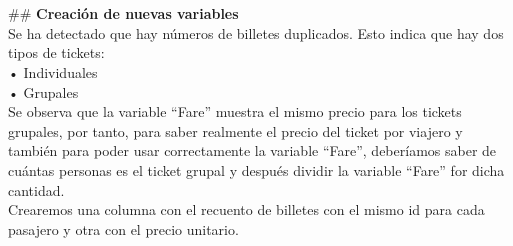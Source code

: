 \documentclass[
]{article}
\newenvironment{Shaded}{\begin{snugshade}}{\end{snugshade}}
\newcommand{\CommentTok}[1]{\textcolor[rgb]{0.56,0.35,0.01}{\textit{#1}}}
\newcommand{\DataTypeTok}[1]{\textcolor[rgb]{0.13,0.29,0.53}{#1}}
\newcommand{\KeywordTok}[1]{\textcolor[rgb]{0.13,0.29,0.53}{\textbf{#1}}}
\newcommand{\NormalTok}[1]{#1}
\newcommand{\OperatorTok}[1]{\textcolor[rgb]{0.81,0.36,0.00}{\textbf{#1}}}
\newcommand{\StringTok}[1]{\textcolor[rgb]{0.31,0.60,0.02}{#1}}
\begin{document}
\texttt{}\\
\texttt{}~\\
\#\# \textbf{Creación de nuevas variables} \texttt{}\\
Se ha detectado que hay números de billetes duplicados. Esto indica que
hay dos tipos de tickets: \texttt{}\\
• Individuales\\
• Grupales \texttt{}\\
Se observa que la variable ``Fare'' muestra el mismo precio para los
tickets grupales, por tanto, para saber realmente el precio del ticket
por viajero y también para poder usar correctamente la variable
``Fare'', deberíamos saber de cuántas personas es el ticket grupal y
después dividir la variable ``Fare'' for dicha cantidad. \texttt{}\\
Crearemos una columna con el recuento de billetes con el mismo id para
cada pasajero y otra con el precio unitario.

\texttt{}

\begin{Shaded}
\end{Shaded}

\texttt{}

\begin{Shaded}
\end{Shaded}

\texttt{}\\
\texttt{}
\end{document}

